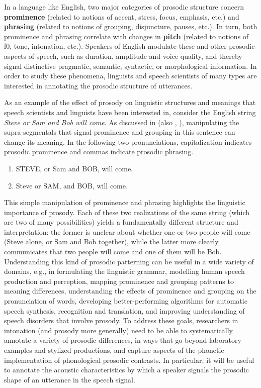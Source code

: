 \documentclass[11pt, twoside]{memoir}
\def\langtext#1{\textit{#1}}
\def\langtextquot#1{\langtext{#1}}
\begin{document}
In a language like English, two major categories of prosodic structure concern \textbf{prominence} (related to notions of accent, stress, focus, emphasis, etc.) and \textbf{phrasing} (related to notions of grouping, disjuncture, pauses, etc.). In turn, both prominence and phrasing correlate with changes in \textbf{pitch} (related to notions of f0, tone, intonation, etc.). Speakers of English modulate these and other prosodic aspects of speech, such as duration, amplitude and voice quality, and thereby signal distinctive pragmatic, semantic, syntactic, or morphological information. In order to study these phenomena, linguists and speech scientists of many types are interested in annotating the prosodic structure of utterances.

As an example of the effect of prosody on linguistic structures and meanings that speech scientists and linguists have been interested in, consider the English string \langtextquot{Steve or Sam and Bob will come}. As discussed in \citealt{lehiste73} (also \citealt{price-91}, \citealt{veilleux-06}), manipulating the supra-segmentals that signal prominence and grouping in this sentence can change its meaning. In the following two pronunciations, capitalization indicates prosodic prominence and commas indicate prosodic phrasing.

\begin{enumerate} \def\labelenumi{\arabic{enumi}.}
\item STEVE, or Sam and BOB, will come.
\item Steve or SAM, and BOB, will come. \end{enumerate}

This simple manipulation of prominence and phrasing highlights the linguistic importance of prosody. Each of these two realizations of the same string (which are two of many possibilities) yields a fundamentally different structure and interpretation: the former is unclear about whether one or two people will come (Steve alone, or Sam and Bob together), while the latter more clearly communicates that two people will come and one of them will be Bob. Understanding this kind of prosodic patterning can be useful in a wide variety of domains, e.g., in formulating the linguistic grammar, modelling human speech production and perception, mapping prominence and grouping patterns to meaning differences, understanding the effects of prominence and grouping on the pronunciation of words, developing better-performing algorithms for automatic speech synthesis, recognition and translation, and improving understanding of speech disorders that involve prosody. To address these goals, researchers in intonation (and prosody more generally) need to be able to systematically annotate a variety of prosodic differences, in ways that go beyond laboratory examples and stylized productions, and capture aspects of the phonetic implementation of phonological prosodic contrasts. In particular, it will be useful to annotate the acoustic characteristics by which a speaker signals the prosodic shape of an utterance in the speech signal.
\end{document}
